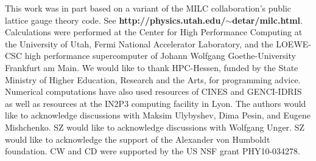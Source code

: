 \documentclass[aps,prd,twocolumn,showpacs,superscriptaddress,groupedaddress]{revtex4}  %
\begin{document}
\acknowledgements
This work was in part based on a variant of the MILC collaboration's public lattice gauge theory code. See {\bf http://physics.utah.edu/$\sim$detar/milc.html}.
Calculations were performed at the Center for High Performance Computing at the University of Utah, Fermi National Accelerator Laboratory, and the LOEWE-CSC high performance supercomputer of Johann Wolfgang Goethe-University Frankfurt am Main. We would like to thank HPC-Hessen, funded by the State Ministry of Higher Education, Research and the Arts, for programming advice. Numerical computations have also used resources of CINES and GENCI-IDRIS as well as resources at the IN2P3 computing facility in Lyon.
The authors would like to acknowledge discussions with Maksim Ulybyshev, Dima Pesin, and Eugene Mishchenko. SZ would like to acknowledge discussions with Wolfgang Unger.
SZ would like to acknowledge the support of the Alexander von Humboldt foundation. CW and CD were supported by the US NSF grant PHY10-034278.

\appendix
\end{document}
